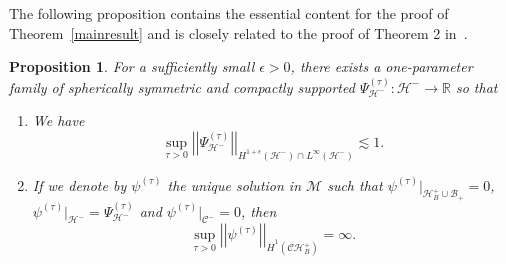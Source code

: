 \documentclass[A4,10pt]{article}
\newtheorem{proposition}{Proposition}[subsection]
\begin{document}
The following proposition contains the essential content for the proof of Theorem~\ref{mainresult} and is closely related to the proof of Theorem 2 in~\cite{DafShlap}.
\begin{proposition}\label{theargheart} For a sufficiently small $\epsilon > 0$, there exists a one-parameter family of spherically symmetric and compactly supported $\Psi^{(\tau)}_{\mathcal{H}^-} : \mathcal{H}^- \to \mathbb{R}$  so that 
\begin{enumerate}
\item We have \[\sup_{\tau > 0}\left\vert\left\vert \Psi^{(\tau)}_{\mathcal{H}^-}\right\vert\right\vert_{H^{1+\epsilon}\left(\mathcal{H}^-\right)\cap L^{\infty}\left(\mathcal{H}^-\right)} \lesssim 1.\]
\item If we denote by $\psi^{(\tau)}$ the unique solution in $\mathcal{M}$ such that $\psi^{(\tau)}|_{\mathcal{H}^+_B\cup \mathcal{B}_+} = 0$, $\psi^{(\tau)}|_{\mathcal{H}^-} = \Psi^{(\tau)}_{\mathcal{H}^-}$ and $\psi^{(\tau)}|_{\mathcal{C}^-} = 0$, then
\[\sup_{\tau > 0}\left\vert\left\vert \psi^{(\tau)}\right\vert\right\vert_{\dot{H}^1\left(\mathcal{CH}^+_B\right)} = \infty.\]
\end{enumerate}

\end{proposition}
\end{document}
